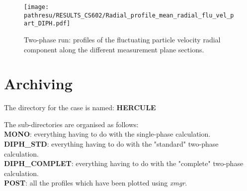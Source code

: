 \documentclass[a4paper,twoside,12pt]{article}
\newcommand{\pathresu}{./FIGURES}
\begin{document}
\begin{figure}[h]
   \centerline{\texttt{[image: \\pathresu/RESULTS\_CS602/Radial\_profile\_mean\_radial\_flu\_vel\_part\_DIPH.pdf]}}
   \caption{Two-phase run: profiles of the fluctuating particle velocity radial component along the different measurement plane sections.}
   \label{VitXpPart}
\end{figure}

\clearpage

\section{Archiving}

The directory for the case is named: \textbf{HERCULE}

The sub-directories are organised as follows:
\medskip\\
\hspace*{2cm}\textbf{MONO}: everything having to do with the single-phase calculation.
\medskip\\
\hspace*{2cm}\textbf{DIPH\_STD}: everything having to do with the "standard" two-phase calculation.
\medskip\\
\hspace*{2cm}\textbf{DIPH\_COMPLET}: everything having to do with the "complete" two-phase calculation.
\medskip\\
\hspace*{2cm}\textbf{POST}: all the profiles which have been plotted using \textit{xmgr}.


\passepage
\end{document}
